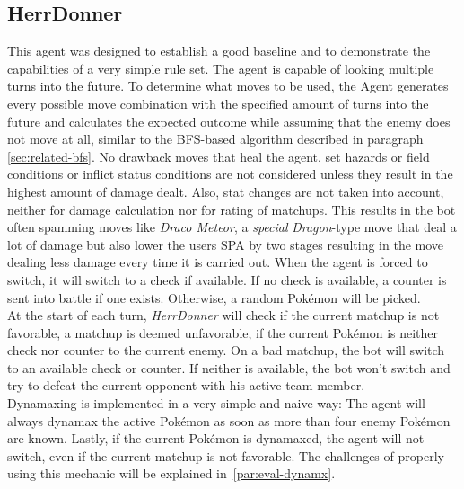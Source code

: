 \subsection{HerrDonner}
This agent was designed to establish a good baseline and to demonstrate the capabilities of a very
simple rule set. The agent is capable of looking multiple turns into the future. To determine
what moves to be used, the Agent generates every possible move combination with the specified amount
of turns into the future and calculates the expected outcome while assuming that the enemy does 
not move at all, similar to the \ac{BFS}-based algorithm described in paragraph \ref{sec:related-bfs}. 
No drawback moves that heal the agent, set hazards or field conditions or inflict status conditions
are not considered unless they result in the highest amount of damage dealt. Also, stat changes are 
not taken into account, neither for damage calculation nor for rating of matchups. 
This results in the bot often spamming moves like \textit{Draco Meteor}, a \textit{special} 
\textit{Dragon}-type move that deal a lot of damage but also lower the
users \ac{SPA} by two stages resulting in the move dealing less damage every time it is carried out. 
When the agent is forced to switch, it will switch to a check if available. If no check is available,
a counter is sent into battle if one exists. Otherwise, a random Pokémon will be picked. \\
At the start of each turn, \textit{HerrDonner} will check if the current matchup is not favorable, 
a matchup is deemed unfavorable, if the current Pokémon is neither check nor 
counter to the current enemy. On a bad matchup, the bot will switch to an available 
check or counter. If neither is available, the bot won't switch and try to
defeat the current opponent with his active team member. \\
Dynamaxing is implemented in a very simple and naive way: The agent will always dynamax the
active Pokémon as soon as more than four enemy Pokémon are known. Lastly, if the
current Pokémon is dynamaxed, the agent will not switch, even if the current matchup is not
favorable. The challenges of properly using this mechanic will be explained in~\ref{par:eval-dynamx}.

